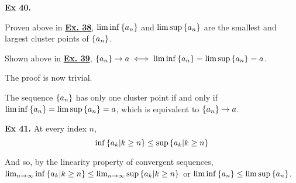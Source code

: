 \noindent \textbf{Ex 40.}

Proven above in \underline{\textbf{Ex. 38}}, $\liminf\left\{a_n\right\}$ and $\limsup\left\{a_n\right\}$ are the smallest and largest cluster points of $\left\{a_n\right\}$.

Shown above in \underline{\textbf{Ex. 39}}, $\left\{a_n\right\}\to a \iff \liminf\left\{a_n\right\} = \limsup\left\{a_n\right\} = a$.

The proof is now trivial.

The sequence $\left\{a_n\right\}$ has only one cluster point if and only if $\liminf\left\{a_n\right\} = \limsup\left\{a_n\right\} = a$, which is equivalent to $\left\{a_n\right\} \to a$.

\noindent \textbf{Ex 41.}
At every index $n$,
\[ \inf\left\{a_k | k \geq n\right\} \leq \sup\left\{a_k | k \geq n\right\} \]

And so, by the linearity property of convergent sequences, $\lim_{n\to\infty}\inf\left\{a_k | k \geq n\right\} \leq \lim_{n\to\infty}\sup\left\{a_k | k \geq n\right\}$ or $\liminf\left\{a_n\right\} \leq \limsup\left\{a_n\right\}$.

